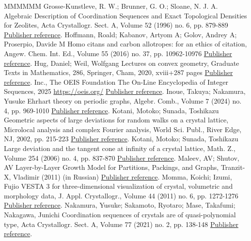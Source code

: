 \begin{thebibliography}{MMMMMM}
 Grosse-Kunstleve, R. W.; Brunner, G. O.; Sloane, N. J. A. Algebraic Description of Coordination Sequences and Exact Topological Densities for Zeolites, Acta Crystallogr. Sect. A, Volume 52 (1996) no. 6, pp. 879-889 \href{https://alco.centre-mersenne.org/articles/10.5802/alco.445/#GKBS96}{Publisher reference}.
 Hoffmann, Roald; Kabanov, Artyom A; Golov, Andrey A; Proserpio, Davide M Homo citans and carbon allotropes: for an ethics of citation, Angew. Chem. Int. Ed., Volume 55 (2016) no. 37, pp. 10962-10976 \href{https://alco.centre-mersenne.org/articles/10.5802/alco.445/#SACADA}{Publisher reference}.
 Hug, Daniel; Weil, Wolfgang Lectures on convex geometry, Graduate Texts in Mathematics, 286, Springer, Cham, 2020, xviii+287 pages \href{https://alco.centre-mersenne.org/articles/10.5802/alco.445/#HW}{Publisher reference}.
 Inc., The OEIS Foundation The On-Line Encyclopedia of Integer Sequences, 2025 \url{https://oeis.org/} \href{https://alco.centre-mersenne.org/articles/10.5802/alco.445/#OEIS}{Publisher reference}.
 Inoue, Takuya; Nakamura, Yusuke Ehrhart theory on periodic graphs, Algebr. Comb., Volume 7 (2024) no. 4, pp. 969-1010 \href{https://alco.centre-mersenne.org/articles/10.5802/alco.445/#IN}{Publisher reference}.
 Kotani, Motoko; Sunada, Toshikazu Geometric aspects of large deviations for random walks on a crystal lattice, Microlocal analysis and complex Fourier analysis, World Sci. Publ., River Edge, NJ, 2002, pp. 215-223 \href{https://alco.centre-mersenne.org/articles/10.5802/alco.445/#KS02}{Publisher reference}.
 Kotani, Motoko; Sunada, Toshikazu Large deviation and the tangent cone at infinity of a crystal lattice, Math. Z., Volume 254 (2006) no. 4, pp. 837-870 \href{https://alco.centre-mersenne.org/articles/10.5802/alco.445/#KS06}{Publisher reference}.
 Maleev, AV; Shutov, AV Layer-by-Layer Growth Model for Partitions, Packings, and Graphs, Tranzit-X, Vladimir (2011) (in Russian) \href{https://alco.centre-mersenne.org/articles/10.5802/alco.445/#MS11}{Publisher reference}.
 Momma, Koichi; Izumi, Fujio VESTA 3 for three-dimensional visualization of crystal, volumetric and morphology data, J. Appl. Crystallogr., Volume 44 (2011) no. 6, pp. 1272-1276 \href{https://alco.centre-mersenne.org/articles/10.5802/alco.445/#MI11}{Publisher reference}.
 Nakamura, Yusuke; Sakamoto, Ryotaro; Mase, Takafumi; Nakagawa, Junichi Coordination sequences of crystals are of quasi-polynomial type, Acta Crystallogr. Sect. A, Volume 77 (2021) no. 2, pp. 138-148 \href{https://alco.centre-mersenne.org/articles/10.5802/alco.445/#NSMN21}{Publisher reference}.

\end{thebibliography}
